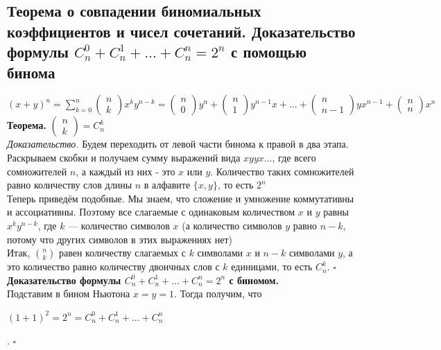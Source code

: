 \documentclass[a4paper]{article}
\newcommand{\qed}{\hfill$\square$}
\begin{document}
\subsection{Теорема о совпадении биномиальных коэффициентов и чисел сочетаний. Доказательство формулы $C^0_n+C^1_n+\ldots+C^n_n=2^n$ с помощью бинома}
\indent $(x+y)^n=\sum\limits_{k=0}^n \begin{pmatrix}
    n\\
    k
\end{pmatrix}x^ky^{n-k}=\begin{pmatrix}
    n\\
    0
\end{pmatrix}y^n+\begin{pmatrix}
    n\\
    1
\end{pmatrix}y^{n-1}x+\ldots+\begin{pmatrix}
    n\\
    n-1
\end{pmatrix}yx^{n-1}+\begin{pmatrix}
    n\\
    n
\end{pmatrix}x^n$\\[2mm]
\textbf{Теорема.} $\begin{pmatrix}
    n\\
    k
\end{pmatrix}=C_n^k$\\[2mm]
\textit{Доказательство.} Будем переходить от левой части бинома к правой в два этапа. Раскрываем скобки и получаем сумму выражений вида $xyyx\ldots$, где всего сомножителей $n$, а каждый из них - это $x$ или $y$. Количество таких сомножителей равно количеству слов длины $n$ в алфавите $\{x,y\}$, то есть $2^n$\\[2mm]
\indent Теперь приведём подобные. Мы знаем, что сложение и умножение коммутативны и ассоциативны. Поэтому все слагаемые с одинаковым количеством $x$ и $y$ равны $x^ky^{n-k}$, где $k$ — количество символов $x$ (а количество символов $y$ равно $n-k$, потому что других символов в этих выражениях нет)\\[2mm]
\indent Итак, $\binom{n}{k}$ равен количеству слагаемых с $k$ символами $x$ и $n-k$ символами $y$, а это количество равно количеству двоичных слов с $k$ единицами, то есть $C_n^k$. \qed\\[2mm]
\textbf{Доказательство формулы $C^0_n+C^1_n+\ldots+C^n_n=2^n$ с биномом.}\\[2mm]
Подставим в бином Ньютона $x = y = 1$. Тогда получим, что\\
 \centerline{$(1+1)^2=2^n=C_n^0+C_n^1+\ldots+C_n^n$}. \qed
\end{document}

